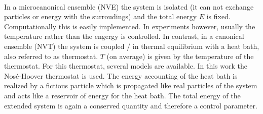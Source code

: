 \documentclass[11pt,DIV=13,BCOR=5mm,a4paper,headinclude]{scrbook}
\begin{document}
\\
In a microcanonical ensemble (NVE) the system is isolated (it can not exchange particles or energy with the surroudings) and the total energy $E$ is fixed.
Computationally this is easily implemented.
In experiments however, usually the temperature rather than the engergy is controlled.
In contrast, in a canonical ensemble (NVT) the system is coupled / in thermal equilibrium with a heat bath, also referred to as thermostat.
$T$ (on average) is given by the temperature of the thermostat.
For this thermostat, several models are available.
In this work the Nos\'{e}-Hoover thermostat\cite{nose1984,nose1984_2,hoover1985} is used.
The energy accounting of the heat bath is realized by a fictious particle which is propagated like real particles of the system and acts like a reservoir of energy for the heat bath.
The total energy of the extended system is again a conserved quantity and therefore a control parameter.
\end{document}
